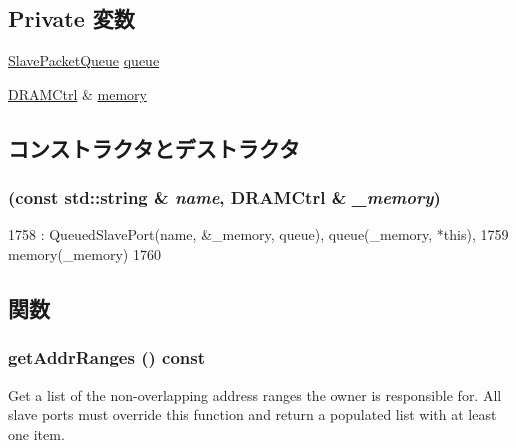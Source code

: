 \subsection*{Private 変数}
\begin{DoxyCompactItemize}
\item 
\hyperlink{classSlavePacketQueue}{SlavePacketQueue} \hyperlink{classDRAMCtrl_1_1MemoryPort_a3055168363a9ed42f38173363b6c1975}{queue}
\item 
\hyperlink{classDRAMCtrl_1_1DRAMCtrl}{DRAMCtrl} \& \hyperlink{classDRAMCtrl_1_1MemoryPort_aab24e4ab19c79062554e1ad4bb0c5eb7}{memory}
\end{DoxyCompactItemize}


\subsection{コンストラクタとデストラクタ}
\hypertarget{classDRAMCtrl_1_1MemoryPort_aee0ee389785135af506951436ea56679}{
\subsubsection[{MemoryPort}]{ (const std::string \& {\em name}, \/  {\bf DRAMCtrl} \& {\em \_\-memory})}}
\label{classDRAMCtrl_1_1MemoryPort_aee0ee389785135af506951436ea56679}



\begin{DoxyCode}
1758     : QueuedSlavePort(name, &_memory, queue), queue(_memory, *this),
1759       memory(_memory)
1760 { }
\end{DoxyCode}


\subsection{関数}
\hypertarget{classDRAMCtrl_1_1MemoryPort_a36cf113d5e5e091ebddb32306c098fae}{
\subsubsection[{getAddrRanges}]{ getAddrRanges () const}}
\label{classDRAMCtrl_1_1MemoryPort_a36cf113d5e5e091ebddb32306c098fae}
Get a list of the non-\/overlapping address ranges the owner is responsible for. All slave ports must override this function and return a populated list with at least one item.

